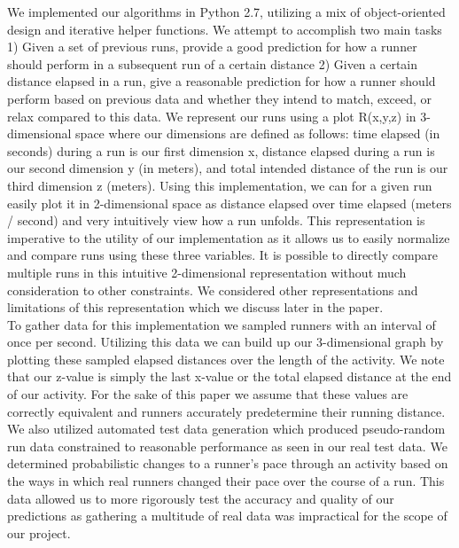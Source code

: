 \documentclass[twoside]{article}
\begin{document}
\begin{multicols}{2}
\indent We implemented our algorithms in Python 2.7, utilizing a mix of object-oriented design and iterative helper functions. We attempt to accomplish two main tasks 1) Given a set of previous runs, provide a good prediction for how a runner should perform in a subsequent run of a certain distance 2) Given a certain distance elapsed in a run, give a reasonable prediction for how a runner should perform based on previous data and whether they intend to match, exceed, or relax compared to this data. We represent our runs using a plot R(x,y,z) in 3-dimensional space where our dimensions are defined as follows: time elapsed (in seconds) during a run is our first dimension x, distance elapsed during a run is our second dimension y (in meters), and total intended distance of the run is our third dimension z (meters). Using this implementation, we can for a given run easily plot it in 2-dimensional space as distance elapsed over time elapsed (meters / second) and very intuitively view how a run unfolds. This representation is imperative to the utility of our implementation as it allows us to easily normalize and compare runs using these three variables.  It is possible to directly compare multiple runs in this intuitive 2-dimensional representation without much consideration to other constraints. We considered other representations and limitations of this representation which we discuss later in the paper.\\

	To gather data for this implementation we sampled runners with an interval of once per second. Utilizing this data we can build up our 3-dimensional graph by plotting these sampled elapsed distances over the length of the activity. We note that our z-value is simply the last x-value or the total elapsed distance at the end of our activity.  For the sake of this paper we assume that these values are correctly equivalent and runners accurately predetermine their running distance. We also utilized automated test data generation which produced pseudo-random run data constrained to reasonable performance as seen in our real test data.  We determined probabilistic changes to a runner's pace through an activity based on the ways in which real runners changed their pace over the course of a run. This data allowed us to more rigorously test the accuracy and quality of our predictions as gathering a multitude of real data was impractical for the scope of our project.\\
	

\end{multicols}
\end{document}
